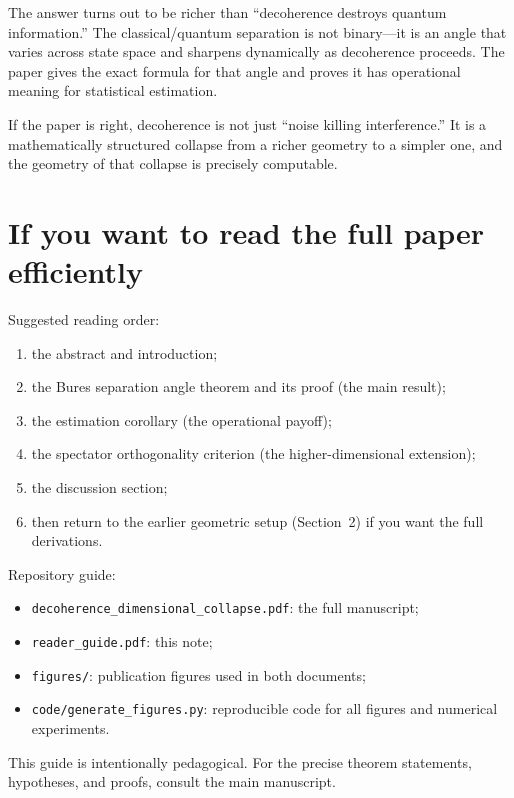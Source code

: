 \documentclass[11pt,a4paper]{article}
\begin{document}
The answer turns out to be richer than ``decoherence destroys quantum information.''  The classical/quantum separation is not binary---it is an angle that varies across state space and sharpens dynamically as decoherence proceeds.  The paper gives the exact formula for that angle and proves it has operational meaning for statistical estimation.

If the paper is right, decoherence is not just ``noise killing interference.''  It is a mathematically structured collapse from a richer geometry to a simpler one, and the geometry of that collapse is precisely computable.

\section*{If you want to read the full paper efficiently}

Suggested reading order:
\begin{enumerate}[leftmargin=1.5em]
\item the abstract and introduction;
\item the Bures separation angle theorem and its proof (the main result);
\item the estimation corollary (the operational payoff);
\item the spectator orthogonality criterion (the higher-dimensional extension);
\item the discussion section;
\item then return to the earlier geometric setup (Section~2) if you want the full derivations.
\end{enumerate}

Repository guide:
\begin{itemize}[leftmargin=1.5em]
\item \texttt{decoherence\_dimensional\_collapse.pdf}: the full manuscript;
\item \texttt{reader\_guide.pdf}: this note;
\item \texttt{figures/}: publication figures used in both documents;
\item \texttt{code/generate\_figures.py}: reproducible code for all figures and numerical experiments.
\end{itemize}

\vfill

\begin{center}
\small
This guide is intentionally pedagogical.  For the precise theorem statements, hypotheses, and proofs, consult the main manuscript.
\end{center}
\end{document}
